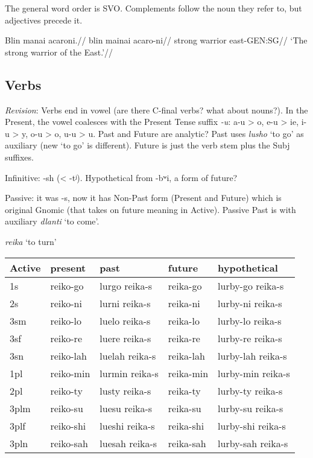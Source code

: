 \documentclass[
  a4paper,
]{article}
\begin{document}
The general word order is SVO. Complements follow the noun they refer
to, but adjectives precede it.

\ex \begingl \glpreamble Blin manai acaroni.// \gla blin mainai
acaro-ni// \glb strong warrior east-GEN:SG// \glft `The strong warrior
of the East.'// \endgl \xe

\hypertarget{verbs}{%
\subsection{Verbs}\label{verbs}}

\emph{Revision}: Verbs end in vowel (are there C-final verbs? what about
nouns?). In the Present, the vowel coalesces with the Present Tense
suffix \emph{-u}: a-u \textgreater{} o, e-u \textgreater{} ie, i-u
\textgreater{} y, o-u \textgreater{} o, u-u \textgreater{} u. Past and
Future are analytic? Past uses \emph{lusho} `to go' as auxiliary (new
`to go' is different). Future is just the verb stem plus the Subj
suffixes.

Infinitive: -sh (\textless{} -tʲ). Hypothetical from -bʷi, a form of
future?

Passive: it was -s, now it has Non-Past form (Present and Future) which
is original Gnomic (that takes on future meaning in Active). Passive
Past is with auxiliary \emph{dlanti} `to come'.

\emph{reika} `to turn'

\begin{longtable}[]{@{}lllll@{}}
\toprule
Active & present & past & future & hypothetical \\
\midrule
\endhead
1s & reiko-go & lurgo reika-s & reika-go & lurby-go reika-s \\
2s & reiko-ni & lurni reika-s & reika-ni & lurby-ni reika-s \\
3sm & reiko-lo & luelo reika-s & reika-lo & lurby-lo reika-s \\
3sf & reiko-re & luere reika-s & reika-re & lurby-re reika-s \\
3sn & reiko-lah & luelah reika-s & reika-lah & lurby-lah reika-s \\
1pl & reiko-min & lurmin reika-s & reika-min & lurby-min reika-s \\
2pl & reiko-ty & lusty reika-s & reika-ty & lurby-ty reika-s \\
3plm & reiko-su & luesu reika-s & reika-su & lurby-su reika-s \\
3plf & reiko-shi & lueshi reika-s & reika-shi & lurby-shi reika-s \\
3pln & reiko-sah & luesah reika-s & reika-sah & lurby-sah reika-s \\
\bottomrule
\end{longtable}
\end{document}
